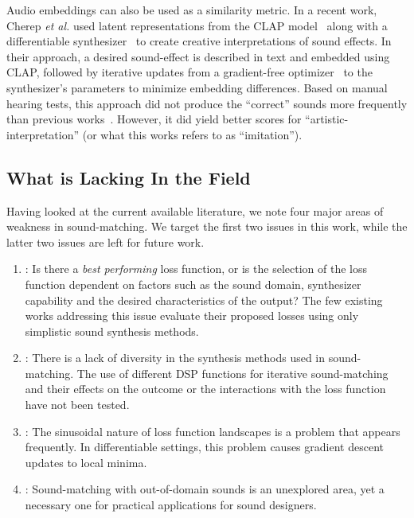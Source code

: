  Audio embeddings can also be used as a similarity metric. In a recent work, Cherep \textit{et al.} used latent representations from the CLAP model~\cite{wu2023large} along with a differentiable synthesizer~\cite{synthhaxcherep2023} to create creative interpretations of sound effects. In their approach, a desired sound-effect is described in text and embedded using CLAP, followed by iterative updates from a gradient-free optimizer~\cite{evosax2022github} to the synthesizer's parameters to minimize embedding differences. Based on manual hearing tests, this approach did not produce the ``correct'' sounds more frequently than previous works~\cite{kreuk2022audiogen}. However, it did yield better scores for ``artistic-interpretation'' (or what this works refers to as ``imitation'').


\subsection{What is Lacking In the Field}
\label{sec:lacking}

Having looked at the current available literature, we note four major areas of weakness in sound-matching. We target the first two issues in this work, while the latter two issues are left for future work.
\begin{enumerate}
    \item \LossSelect: Is there a \textit{best performing} loss function, or is the selection of the loss function dependent on factors such as the sound domain, synthesizer capability and the desired characteristics of the output? The few existing works addressing this issue evaluate their proposed losses using only simplistic sound synthesis methods.
    \item \SynthSelect: There is a lack of diversity in the synthesis methods used in sound-matching. The use of different DSP functions for iterative sound-matching and their effects on the outcome or the interactions with the loss function have not been tested.
    \item \PeriodicLoss: The sinusoidal nature of loss function landscapes is a problem that appears frequently. In differentiable settings, this problem causes gradient descent updates to local minima. 
    \item \OutDomain: Sound-matching with out-of-domain sounds is an unexplored area, yet a necessary one for practical applications for sound designers.
\end{enumerate}

